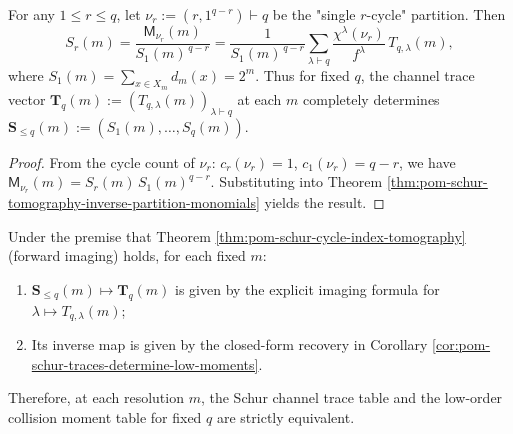 \begin{corollary}\label{cor:pom-schur-traces-determine-low-moments}
For any \(1\le r\le q\), let \(\nu_r:=(r,1^{q-r})\vdash q\) be the "single \(r\)-cycle" partition.
Then
\[
S_r(m)
=\frac{\mathsf{M}_{\nu_r}(m)}{S_1(m)^{\,q-r}}
=\frac{1}{S_1(m)^{\,q-r}}
\sum_{\lambda\vdash q}\frac{\chi^\lambda(\nu_r)}{f^\lambda}\,T_{q,\lambda}(m),
\]
where \(S_1(m)=\sum_{x\in X_m}d_m(x)=2^m\).
Thus for fixed \(q\), the channel trace vector \(\mathbf T_q(m):=(T_{q,\lambda}(m))_{\lambda\vdash q}\) at each \(m\) completely determines \(\mathbf S_{\le q}(m):=(S_1(m),\dots,S_q(m))\).
\end{corollary}
\begin{proof}
From the cycle count of \(\nu_r\): \(c_r(\nu_r)=1\), \(c_1(\nu_r)=q-r\), we have
\(
\mathsf{M}_{\nu_r}(m)=S_r(m)\,S_1(m)^{q-r}
\).
Substituting into Theorem \ref{thm:pom-schur-tomography-inverse-partition-monomials} yields the result.
\end{proof}

\begin{corollary}\label{cor:pom-schur-traces-moments-bijection}
Under the premise that Theorem \ref{thm:pom-schur-cycle-index-tomography} (forward imaging) holds, for each fixed \(m\):
\begin{enumerate}
  \item \(\mathbf S_{\le q}(m)\mapsto \mathbf T_q(m)\) is given by the explicit imaging formula for \(\lambda\mapsto T_{q,\lambda}(m)\);
  \item Its inverse map is given by the closed-form recovery in Corollary \ref{cor:pom-schur-traces-determine-low-moments}.
\end{enumerate}
Therefore, at each resolution \(m\), the Schur channel trace table and the low-order collision moment table for fixed \(q\) are strictly equivalent.
\end{corollary}

